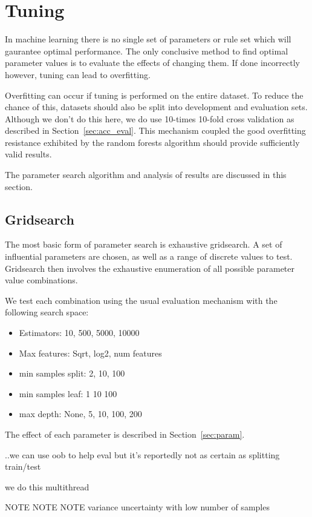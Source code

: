 \section{Tuning}\label{sec:tuning}
In machine learning there is no single set of parameters or rule set which will
gaurantee optimal performance.
The only conclusive method to find optimal parameter values is to evaluate
the effects of changing them.
If done incorrectly however, tuning can lead to overfitting.

Overfitting can occur if tuning is performed on the entire dataset.
To reduce the chance of this, datasets should also be split into development
and evaluation sets.
Although we don't do this here, we do use 10-times 10-fold cross validation as
described in Section~\ref{sec:acc_eval}.
This mechanism coupled the good overfitting resistance exhibited by the random
forests algorithm should provide sufficiently valid results.

The parameter search algorithm and analysis of results are discussed in this
section.


\subsection{Gridsearch}
The most basic form of parameter search is exhaustive gridsearch.
A set of influential parameters are chosen, as well as a range of discrete
values to test.
Gridsearch then involves the exhaustive enumeration  of all possible parameter
value combinations.

We test each combination using the usual evaluation mechanism with the following
search space:
\begin{itemize}
  \item Estimators: 10, 500, 5000, 10000
  \item Max features: Sqrt, log2, num features
  \item min samples split: 2, 10, 100
  \item min samples leaf: 1 10 100
  \item max depth: None, 5, 10, 100, 200
\end{itemize}

The effect of each parameter is described in Section~\ref{sec:param}.

..we can use oob to help eval but it's reportedly not as certain as splitting
train/test

we do this multithread

NOTE NOTE NOTE
variance uncertainty with low number of samples

